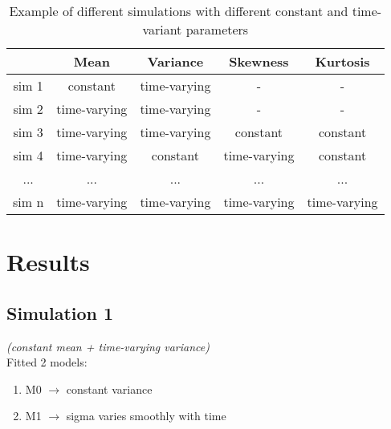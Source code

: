 \documentclass{article}
\begin{document}
\begin{table} [h]
    \centering
    \caption{Example of different simulations with different constant and time-variant parameters}
    \begin{tabular}{c|cccc}
          & Mean & Variance & Skewness & Kurtosis \\
         \hline
         sim 1 & constant & time-varying & - & - \\
         sim 2 & time-varying & time-varying & - & - \\
         sim 3 & time-varying & time-varying & constant & constant  \\
         sim 4 & time-varying & constant & time-varying & constant \\
         ... &  ... & ... & ... & ... \\
         sim n &  time-varying & time-varying & time-varying & time-varying
    \end{tabular}
    \label{simtable}
\end{table}

\section*{Results}

\subsection{Simulation 1}
\textit{(constant mean + time-varying variance)} \\

\noindent Fitted 2 models:

\begin{enumerate}
    \item M0 $\rightarrow$ constant variance 
    \item M1 $\rightarrow$ sigma varies smoothly with time
\end{enumerate}


\end{document}
